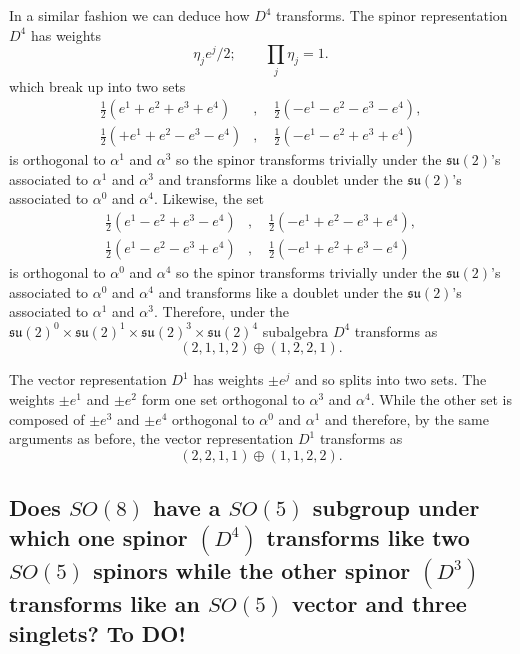 \documentclass[main.tex]{subfiles}
\begin{document}
In a similar fashion we can deduce how $D^4$ transforms. The spinor representation $D^4$ has weights
\begin{equation}
\eta_je^j/2;\qquad\prod_{j}\eta_j=1.
\end{equation}
which break up into two sets
\begin{equation}\label{eq:set1D4}
\begin{split}
\frac{1}{2}(e^1+e^2+e^3+e^4)&,\quad\frac{1}{2}(-e^1-e^2-e^3-e^4),\\\frac{1}{2}(+e^1+e^2-e^3-e^4)&,\quad\frac{1}{2}(-e^1-e^2+e^3+e^4)
\end{split}
\end{equation}
is orthogonal to $\alpha^1$ and $\alpha^3$ so the spinor transforms trivially under the $\mathfrak{su}(2)$'s associated to $\alpha^1$ and $\alpha^3$ and transforms like a doublet under the $\mathfrak{su}(2)$'s associated to $\alpha^0$ and $\alpha^4$. 
Likewise, the set 
\begin{equation}\label{eq:set2D4}
\begin{split}
\frac{1}{2}(e^1-e^2+e^3-e^4)&,\quad\frac{1}{2}(-e^1+e^2-e^3+e^4),\\\frac{1}{2}(e^1-e^2-e^3+e^4)&,\quad\frac{1}{2}(-e^1+e^2+e^3-e^4)
\end{split}
\end{equation}
is orthogonal to $\alpha^0$ and $\alpha^4$ so the spinor transforms trivially under the $\mathfrak{su}(2)$'s associated to $\alpha^0$ and $\alpha^4$ and transforms like a doublet under the $\mathfrak{su}(2)$'s associated to $\alpha^1$ and $\alpha^3$. 
Therefore, under the $\mathfrak{su}(2)^0\times\mathfrak{su}(2)^1\times\mathfrak{su}(2)^3\times\mathfrak{su}(2)^4$ subalgebra $D^4$ transforms as
\begin{equation}
(2,1,1,2)\oplus(1,2,2,1).
\end{equation}

The vector representation $D^1$ has weights $\pm e^j$ and so splits into two sets. The weights $\pm e^1$ and $\pm e^2$ form one set orthogonal to $\alpha^3$ and $\alpha^4$. While the other set is composed of $\pm e^3$ and $\pm e^4$ orthogonal to $\alpha^0$ and $\alpha^1$ and therefore, by the same arguments as before, the vector representation $D^1$ transforms as
\begin{equation}
(2,2,1,1)\oplus(1,1,2,2).
\end{equation}

\subsection{Does $SO(8)$ have a $SO(5)$ subgroup under which one spinor $(D^4)$ transforms like two $SO(5)$ spinors while the other spinor $(D^3)$ transforms like an $SO(5)$ vector and three singlets? To DO!}
\end{document}
